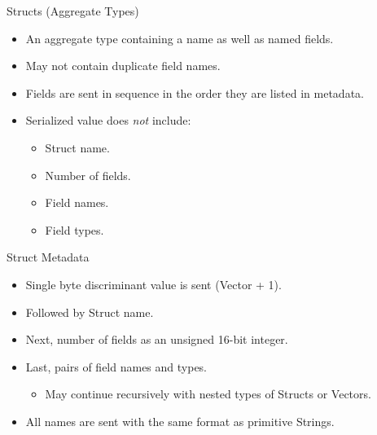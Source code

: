 \documentclass{beamer}
\begin{document}
\begin{frame}{Structs (Aggregate Types)}
	\begin{itemize}
		\item	An aggregate type containing a name as well as named fields.
		\item May not contain duplicate field names.
		\item Fields are sent in sequence in the order they are listed in metadata.
		\item Serialized value does \emph{not} include:
		      \begin{itemize}
			      \item Struct name.
			      \item Number of fields.
			      \item Field names.
			      \item Field types.
		      \end{itemize}
	\end{itemize}
\end{frame}

\begin{frame}{Struct Metadata}
	\begin{itemize}
		\item Single byte discriminant value is sent (Vector + 1).
		\item Followed by Struct name.
		\item Next, number of fields as an unsigned 16-bit integer.
		\item Last, pairs of field names and types.
		      \begin{itemize}
			      \item May continue recursively with nested types of Structs or Vectors.
		      \end{itemize}
		\item All names are sent with the same format as primitive Strings.
	\end{itemize}
\end{frame}
\end{document}
